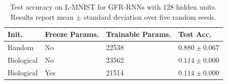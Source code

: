 \begin{table}[htp]
    \caption{Test accuracy on L-MNIST for GFR-RNNs with 128 hidden units. Results report mean $\pm$ standard deviation over five random seeds.}
    \label{tab:bio-lmnist-reproduced}
    \centering
    \begin{tabular}{llll}
    \toprule
    \textbf{Init.} & \textbf{Freeze Params.} & \textbf{Trainable Params.} & \textbf{Test Acc.} \\
    \midrule
    Random & No & 22538 & $0.880 \pm 0.067$ \\
    Biological & No & 23562 & $0.114 \pm 0.000$ \\
    Biological & Yes & 21514 & $0.114 \pm 0.000$ \\
    \bottomrule
    \end{tabular}
\end{table}
